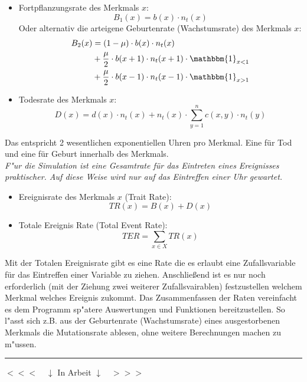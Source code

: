 \documentclass[11pt, a4paper, german]{article}
\begin{document}
	\begin{itemize}
		\item Fortpflanzungsrate des Merkmals $ x $: 
		\[ B_1(x) = b(x) \cdot n_t(x) \]
		Oder alternativ die arteigene Geburtenrate (Wachstumsrate) des Merkmals $ x $: 
		\begin{align*}
			B_2(x)  & = (1 - \mu) \cdot b(x) \cdot n_t(x)\\
				  & + \frac{\mu}{2} \cdot b(x+1) \cdot n_t(x+1) \cdot \mathbbm{1}_{x<1}\\
				  & + \frac{\mu}{2} \cdot b(x-1) \cdot n_t(x-1) \cdot \mathbbm{1}_{x>1}
		\end{align*}
		\item Todesrate des Merkmals $ x $: 
		\[ D(x) = d(x) \cdot n_t(x) + n_t(x) \cdot \sum_{y=1}^{n} c(x,y) \cdot n_t(y) \]
	\end{itemize}
	Das entspricht 2 wesentlichen exponentiellen Uhren pro Merkmal. Eine für Tod und eine für Geburt innerhalb des Merkmals.\\
	\textit{F"ur die Simulation ist eine Gesamtrate für das Eintreten eines Ereignisses praktischer. Auf diese Weise wird nur auf das Eintreffen einer Uhr gewartet.}
	\begin{itemize}
		\item Ereignisrate des Merkmals $ x $ (Trait Rate):
		\[ TR(x) = B(x) + D(x) \]
		\item Totale Ereignis Rate (Total Event Rate): 
		\[ TER = \sum_{x \in X} TR(x)\]
	\end{itemize}
	Mit der Totalen Ereignisrate gibt es eine Rate die es erlaubt eine Zufallsvariable für das Eintreffen einer Variable zu ziehen. Anschließend ist es nur noch erforderlich (mit der Ziehung zwei weiterer Zufallsvairablen) festzustellen welchem Merkmal welches Ereignis zukommt. Das Zusammenfassen der Raten vereinfacht es dem Programm sp"atere Auswertungen und Funktionen bereitzustellen. So l"asst sich z.B. aus der Geburtenrate (Wachstumsrate) eines ausgestorbenen Merkmals die Mutationsrate ablesen, ohne weitere Berechnungen machen zu m"ussen.\\
	
	\noindent\rule{\textwidth}{2pt}
	\begin{center}
		$ <<< \quad \downarrow $ In Arbeit $ \downarrow \quad >>> $
	\end{center}
	
\end{document}
